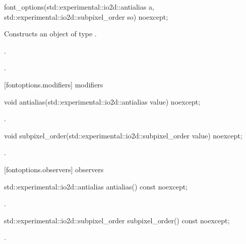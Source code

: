 \begin{itemdecl}
    font_options(std::experimental::io2d::antialias a,
      std::experimental::io2d::subpixel_order so) noexcept;
\end{itemdecl}
\begin{itemdescr}
	\pnum
	\effects
	Constructs an object of type .
	
	\pnum
	\postconditions
	.
	
	.
	
\end{itemdescr}

 [fontoptions.modifiers] { modifiers}

\begin{itemdecl}
    void antialias(std::experimental::io2d::antialias value) noexcept;
\end{itemdecl}
\begin{itemdescr}
	\pnum
	\postconditions
	.
	
\end{itemdescr}

\begin{itemdecl}
    void subpixel_order(std::experimental::io2d::subpixel_order value) noexcept;
\end{itemdecl}
\begin{itemdescr}
	\pnum
	\postconditions
	.
	
\end{itemdescr}

 [fontoptions.observers] { observers}

\begin{itemdecl}
std::experimental::io2d::antialias antialias() const noexcept;
\end{itemdecl}
\begin{itemdescr}
	\pnum
	\returns
	.

\end{itemdescr}

\begin{itemdecl}
std::experimental::io2d::subpixel_order subpixel_order() const noexcept;
\end{itemdecl}
\begin{itemdescr}
	\pnum
	\returns
	.
	
\end{itemdescr}
